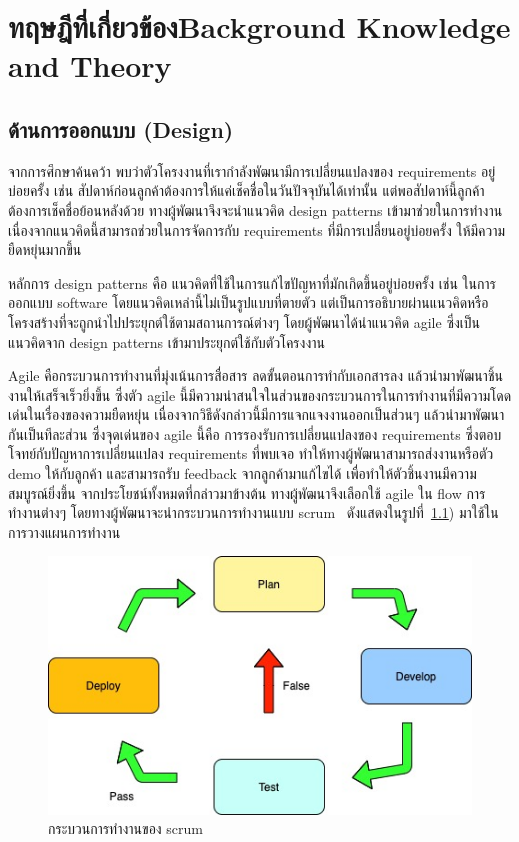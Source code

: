 \chapter{\ifcpe ทฤษฎีที่เกี่ยวข้อง\else Background Knowledge and Theory\fi}

\section{ด้านการออกแบบ (Design)}
จากการศึกษาค้นคว้า พบว่าตัวโครงงานที่เรากำลังพัฒนามีการเปลี่ยนแปลงของ requirements อยู่บ่อยครั้ง เช่น สัปดาห์ก่อนลูกค้าต้องการให้แค่เช็คชื่อในวันปัจจุบันได้เท่านั้น  แต่พอสัปดาห์นี้ลูกค้าต้องการเช็คชื่อย้อนหลังด้วย
ทางผู้พัฒนาจึงจะนำแนวคิด design patterns \cite{designPatterns} เข้ามาช่วยในการทำงาน เนื่องจากแนวคิดนี้สามารถช่วยในการจัดการกับ requirements ที่มีการเปลี่ยนอยู่บ่อยครั้ง ให้มีความยืดหยุ่นมากขึ้น


หลักการ design patterns คือ แนวคิดที่ใช้ในการแก้ไขปัญหาที่มักเกิดขึ้นอยู่บ่อยครั้ง เช่น ในการออกแบบ software โดยแนวคิดเหล่านี้ไม่เป็นรูปแบบที่ตายตัว แต่เป็นการอธิบายผ่านแนวคิดหรือโครงสร้างที่จะถูกนำไปประยุกต์ใช้ตามสถานการณ์ต่างๆ  
โดยผู้พัฒนาได้นำแนวคิด agile \cite{agile}  ซึ่งเป็นแนวคิดจาก design patterns เข้ามาประยุกต์ใช้กับตัวโครงงาน 


Agile คือกระบวนการทำงานที่มุ่งเน้นการสื่อสาร ลดขั้นตอนการทำกับเอกสารลง แล้วนำมาพัฒนาชิ้นงานให้เสร็จเร็วยิ่งขึ้น  ซึ่งตัว agile นี้มีความน่าสนใจในส่วนของกระบวนการในการทำงานที่มีความโดดเด่นในเรื่องของความยืดหยุ่น  เนื่องจากวิธีดังกล่าวนี้มีการแจกแจงงานออกเป็นส่วนๆ  แล้วนำมาพัฒนากันเป็นทีละส่วน  
ซึ่งจุดเด่นของ agile นี้คือ การรองรับการเปลี่ยนแปลงของ requirements ซึ่งตอบโจทย์กับปัญหาการเปลี่ยนแปลง requirements ที่พบเจอ ทำให้ทางผู้พัฒนาสามารถส่งงานหรือตัว demo ให้กับลูกค้า และสามารถรับ feedback จากลูกค้ามาแก้ไขได้ เพื่อทำให้ตัวชิ้นงานมีความสมบูรณ์ยิ่งขึ้น 
 จากประโยชน์ทั้งหมดที่กล่าวมาข้างต้น ทางผู้พัฒนาจึงเลือกใช้ agile ใน flow การทำงานต่างๆ โดยทางผู้พัฒนาจะนำกระบวนการทำงานแบบ scrum~\cite{srcum} ดังแสดงในรูปที่~\ref{fig:Scrum}) มาใช้ในการวางแผนการทำงาน 
%
\begin{figure}
  \begin{center}
    \includegraphics[width=\linewidth]{images/scrum.jpeg}
  \end{center}
  \caption[กระบวนการทำงานของ scrum]{กระบวนการทำงานของ scrum}
  \label{fig:Scrum}
\end{figure}


